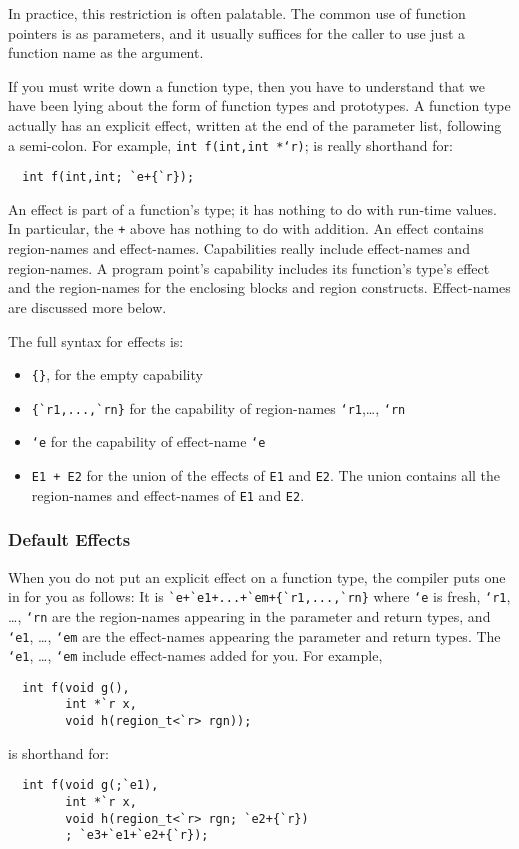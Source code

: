 In practice, this restriction is often palatable.  The common use of
function pointers is as parameters, and it usually suffices for the
caller to use just a function name as the argument.

If you must write down a function type, then you have to understand
that we have been lying about the form of function types and
prototypes.  A function type actually has an explicit effect, written
at the end of the parameter list, following a semi-colon.  For
example, \texttt{int f(int,int *`r)}; is really shorthand for:

\begin{verbatim}
  int f(int,int; `e+{`r});
\end{verbatim}

An effect is part of a function's type; it has nothing to do with
run-time values.  In particular, the \texttt{+} above has nothing to do
with addition.  An effect contains region-names and effect-names.
Capabilities really include effect-names and region-names.  A program
point's capability includes its function's type's effect and the
region-names for the enclosing blocks and region constructs.
Effect-names are discussed more below.

The full syntax for effects is:

\begin{itemize}
\item \verb|{}|, for the empty capability 
\item \verb|{`r1,...,`rn}| for the capability of region-names
  \texttt{`r1},\ldots, \texttt{`rn} 
\item \texttt{`e} for the capability of effect-name \texttt{`e} 
\item \texttt{E1 + E2} for the union of the effects of \texttt{E1} and
  \texttt{E2}.  The union contains all the region-names and effect-names
  of \texttt{E1} and \texttt{E2}. 
\end{itemize}

\subsubsection{Default Effects}

When you do not put an explicit effect on a function type, the
compiler puts one in for you as follows: It is
\verb|`e+`e1+...+`em+{`r1,...,`rn}| where \texttt{`e} is fresh,
\texttt{`r1}, \ldots, \texttt{`rn} are the region-names appearing in the
parameter and return types, and \texttt{`e1}, \ldots, \texttt{`em} are the
effect-names appearing the parameter and return types.  The
\texttt{`e1}, \ldots, \texttt{`em} include effect-names added for you.
For example,
\begin{verbatim}
  int f(void g(), 
        int *`r x, 
        void h(region_t<`r> rgn));
\end{verbatim}
is shorthand for:
\begin{verbatim}
  int f(void g(;`e1), 
        int *`r x, 
        void h(region_t<`r> rgn; `e2+{`r})
        ; `e3+`e1+`e2+{`r});
\end{verbatim}

